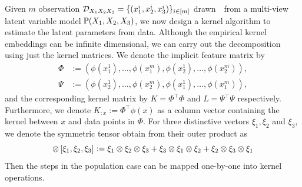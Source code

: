 \documentclass{article}
\begin{document}
Given $m$ observation $\mathcal{D}_{X_1 X_2 X_3}=\{(x_1^i,x_2^i,x_3^i)\}_{i \in [m]}$ drawn~\iid~from a multi-view latent variable model $\mathbb{P}(X_1,X_2,X_3)$, we now design a kernel algorithm to estimate the latent parameters from data. Although the empirical kernel embeddings can be infinite dimensional, we can carry out the decomposition using just the kernel matrices.
We  denote the implicit feature matrix by
\begin{align*}
  \Phi &:= (\phi(x_1^1), \ldots, \phi(x_1^m), \phi(x_2^1),  \ldots, \phi(x_2^m)),  \\
  \Psi &:= (\phi(x_2^1), \ldots, \phi(x_2^m), \phi(x_1^1),  \ldots, \phi(x_1^m)),
\end{align*}
and the corresponding kernel matrix by $K = \Phi^\top \Phi$ and $L = \Psi^\top \Psi$ respectively.
Furthermore, we denote $K_{:x}:=\Phi^\top \phi(x)$ as a column vector containing the kernel between $x$ and data points in $\Phi$. For three distinctive vectors $\xi_1, \xi_2$ and $\xi_3$, we denote the symmetric tensor obtain from their outer product as
$$
	\otimes\left[\xi_1,\xi_2,\xi_3\right] := \xi_1\otimes\xi_2\otimes\xi_3 + \xi_3\otimes\xi_1\otimes\xi_2 + \xi_2\otimes\xi_3\otimes\xi_1
$$
Then the steps in the population case can be mapped one-by-one into kernel operations.
\end{document}
